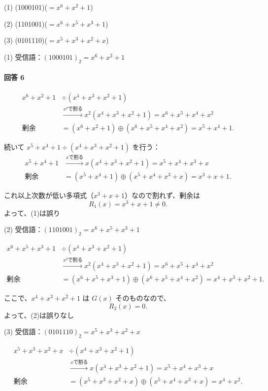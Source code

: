 \documentclass[dvipdfmx,titlepage,a4j]{jsarticle}
\begin{document}
(1) (1000101)($=x^6+x^2+1$)

(2) (1101001)($=x^6+x^5+x^3+1$)

(3) (0101110)($=x^5+x^3+x^2+x$)

(1) 受信語：$(1000101)_2 = x^6 + x^2 + 1$

\paragraph{ 回答 6\\}
\[
\begin{aligned}
x^6 + x^2 + 1 &\div (x^4 + x^3 + x^2 + 1) \\
&\xrightarrow{x^2 \text{で割る}} x^2 (x^4 + x^3 + x^2 + 1) = x^6 + x^5 + x^4 + x^2 \\
\text{剰余} &= (x^6 + x^2 + 1) \oplus (x^6 + x^5 + x^4 + x^2) = x^5 + x^4 + 1.
\end{aligned}
\]

続いて $x^5 + x^4 + 1 \div (x^4 + x^3 + x^2 + 1)$ を行う：
\[
\begin{aligned}
x^5 + x^4 + 1 &\xrightarrow{x \text{で割る}} x (x^4 + x^3 + x^2 + 1) = x^5 + x^4 + x^3 + x \\
\text{剰余} &= (x^5 + x^4 + 1) \oplus (x^5 + x^4 + x^3 + x) = x^3 + x + 1.
\end{aligned}
\]

これ以上次数が低い多項式（$x^3 + x + 1$）なので割れず、剰余は
\[
R_1(x) = x^3 + x + 1 \neq 0.
\]
よって、(1)は誤り

(2) 受信語：$(1101001)_2 = x^6 + x^5 + x^3 + 1$

\[
\begin{aligned}
x^6 + x^5 + x^3 + 1 &\div (x^4 + x^3 + x^2 + 1) \\
&\xrightarrow{x^2 \text{で割る}} x^2(x^4 + x^3 + x^2 + 1) = x^6 + x^5 + x^4 + x^2 \\
\text{剰余} &= (x^6 + x^5 + x^3 + 1) \oplus (x^6 + x^5 + x^4 + x^2) = x^4 + x^3 + x^2 + 1.
\end{aligned}
\]

ここで、$x^4 + x^3 + x^2 + 1$ は $G(x)$ そのものなので、
\[
R_2(x) = 0.
\]
よって、(2)は誤りなし

(3) 受信語：$(0101110)_2 = x^5 + x^3 + x^2 + x$

\[
\begin{aligned}
x^5 + x^3 + x^2 + x &\div (x^4 + x^3 + x^2 + 1) \\
&\xrightarrow{x \text{で割る}} x (x^4 + x^3 + x^2 + 1) = x^5 + x^4 + x^3 + x \\
\text{剰余} &= (x^5 + x^3 + x^2 + x) \oplus (x^5 + x^4 + x^3 + x) = x^4 + x^2.
\end{aligned}
\]
\end{document}
